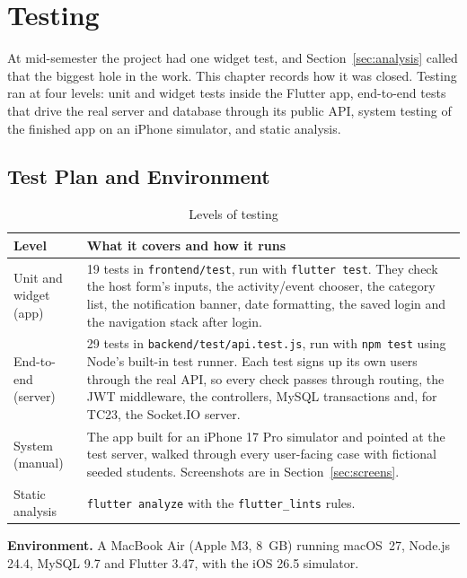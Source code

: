 
\chapter{Testing}
\label{ch:testing}

At mid-semester the project had one widget test, and Section~\ref{sec:analysis} called
that the biggest hole in the work. This chapter records how it was closed. Testing ran at
four levels: unit and widget tests inside the Flutter app, end-to-end tests that drive the
real server and database through its public API, system testing of the finished app on an
iPhone simulator, and static analysis.

\section{Test Plan and Environment}

\begin{table}[H]
\centering
\begin{tabular}{|L{3.2cm}|L{8.3cm}|}
\hline
\textbf{Level} & \textbf{What it covers and how it runs} \\
\hline
Unit and widget (app) & 19 tests in \texttt{frontend/test}, run with
\texttt{flutter test}. They check the host form's inputs, the activity/event chooser,
the category list, the notification banner, date formatting, the saved login and the
navigation stack after login. \\
\hline
End-to-end (server) & 29 tests in \texttt{backend/test/api.test.js}, run with
\texttt{npm test} using Node's built-in test runner. Each test signs up its own users
through the real API, so every check passes through routing, the JWT middleware, the
controllers, MySQL transactions and, for TC23, the Socket.IO server. \\
\hline
System (manual) & The app built for an iPhone 17 Pro simulator and pointed at the test
server, walked through every user-facing case with fictional seeded students.
Screenshots are in Section~\ref{sec:screens}. \\
\hline
Static analysis & \texttt{flutter analyze} with the \texttt{flutter\_lints} rules. \\
\hline
\end{tabular}
\caption{Levels of testing}
\label{tab:testlevels}
\end{table}

\noindent\textbf{Environment.} A MacBook Air (Apple M3, 8~GB) running macOS~27, Node.js
24.4, MySQL 9.7 and Flutter 3.47, with the iOS 26.5 simulator.

